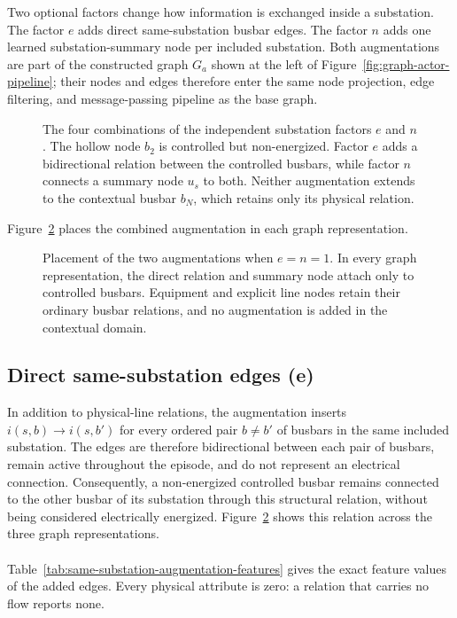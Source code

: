 Two optional factors change how information is exchanged inside a substation.
The factor $e$ adds direct same-substation busbar edges. The factor $n$ adds one
learned substation-summary node per included substation. Both augmentations are
part of the constructed graph $G_a$ shown at the left of
Figure~\ref{fig:graph-actor-pipeline}; their nodes and edges therefore enter the
same node projection, edge filtering, and message-passing pipeline as the base
graph.

\begin{figure}[H]
  \centering
  \resizebox{0.94\linewidth}{!}{%
  }
  \caption{The four combinations of the independent substation factors $e$ and
  $n$. The hollow node $b_2$ is controlled but non-energized. Factor $e$ adds a
  bidirectional relation between the controlled busbars, while factor $n$
  connects a summary node $u_s$ to both. Neither augmentation extends to the
  contextual busbar $b_N$, which retains only its physical relation.}
  \label{fig:substation-augmentation-combinations}
\end{figure}

Figure~\ref{fig:substation-augmentation-by-representation} places the combined
augmentation in each graph representation.

\begin{figure}[H]
  \centering
  \resizebox{0.98\linewidth}{!}{%
  }
  \caption{Placement of the two augmentations when $e=n=1$. In every graph
  representation, the direct relation and summary node attach only to
  controlled busbars. Equipment and explicit line nodes retain their ordinary
  busbar relations, and no augmentation is added in the contextual domain.}
  \label{fig:substation-augmentation-by-representation}
\end{figure}

\subsection{Direct same-substation edges (e)}
\label{subsec:graph-relation-edges}

In addition to physical-line relations, the augmentation inserts
$i(s,b)\rightarrow i(s,b')$ for every ordered pair $b\neq b'$ of busbars in the
same included substation. The edges are therefore bidirectional between each
pair of busbars, remain active throughout the episode, and do not represent an
electrical connection. Consequently, a non-energized controlled busbar remains
connected to the other busbar of its substation through this structural
relation, without being considered electrically energized.
Figure~\ref{fig:substation-augmentation-by-representation} shows this relation
across the three graph representations.
\\
\\
Table~\ref{tab:same-substation-augmentation-features} gives the exact feature
values of the added edges. Every physical attribute is zero: a relation that carries no flow reports
none.

